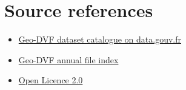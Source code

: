 \documentclass[11pt,a4paper]{article}
\begin{document}
\section{Source references}

\begin{itemize}[leftmargin=1.5em]
\item \href{https://www.data.gouv.fr/datasets/demandes-de-valeurs-foncieres-geolocalisees}{Geo-DVF dataset catalogue on data.gouv.fr}
\item \href{https://files.data.gouv.fr/geo-dvf/latest/csv/}{Geo-DVF annual file index}
\item \href{https://www.etalab.gouv.fr/licence-ouverte-open-licence/}{Open Licence 2.0}
\end{itemize}
\end{document}
